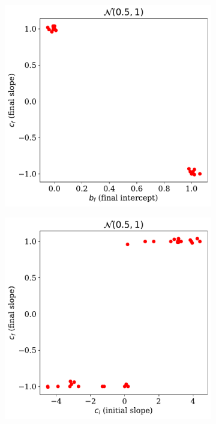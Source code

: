 \begin{figure}
    \centering
    \begin{subfigure}[b]{0.31\textwidth}
        \centering
        \includegraphics[width=\textwidth]{figures/chapter-09/b_fc_f.pdf}
        \caption{}
        \label{fig:Z2numeric_i}
    \end{subfigure}
    \hfill
    \begin{subfigure}[b]{0.31\textwidth}
        \centering
        \includegraphics[width=\textwidth]{figures/chapter-09/c_ic_f.pdf}

\end{subfigure}
\end{figure}
